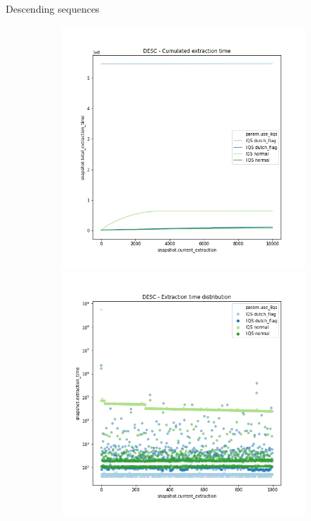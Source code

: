 \documentclass{beamer}
\begin{document}
\begin{frame}{Descending sequences}
    \begin{figure}
        \centering
        \begin{subfigure}[b]{\textwidth}
            \centering
            \includegraphics[height=0.4\textheight]{chapter4/02-basebenchmark-03-sort-d-case.png.0-0.png}
            \includegraphics[height=0.4\textheight]{chapter4/02-basebenchmark-03-sort-d-case.png.1-1.png}

\end{subfigure}
\end{figure}
\end{frame}
\end{document}

